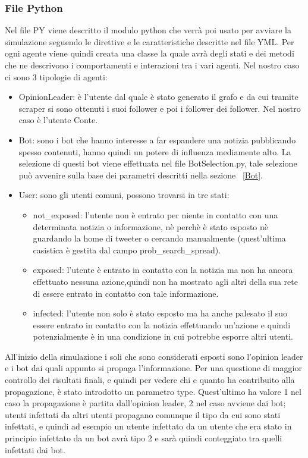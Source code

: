         \subsubsection{File Python}
        Nel file PY viene descritto il modulo python che verrà poi usato per avviare la simulazione seguendo le direttive e le caratteristiche descritte nel file YML. Per ogni agente viene quindi creata una classe la quale avrà degli stati e dei metodi che ne descrivono i comportamenti e interazioni tra i vari agenti. Nel nostro caso ci sono 3 tipologie di agenti:
        \begin{itemize}
        \item OpinionLeader: è l’utente dal quale è stato generato il grafo e da cui tramite scraper si sono ottenuti i suoi follower e poi i follower dei follower. Nel nostro caso è l’utente Conte.
        \item Bot: sono i bot che hanno interesse a far espandere una notizia pubblicando spesso contenuti, hanno quindi un potere di influenza mediamente alto. La selezione di questi bot viene effettuata nel file BotSelection.py, tale selezione può avvenire sulla base dei parametri descritti nella sezione ~\ref{Bot}.
        \item User: sono gli utenti comuni, possono trovarsi in tre stati:
          \begin{itemize}
          \item not_exposed: l’utente non è entrato per niente in contatto con una determinata notizia o informazione, nè perchè è stato esposto nè guardando la home di tweeter o cercando manualmente (quest’ultima casistica è gestita dal campo prob_search_spread).
          \item exposed: l’utente è entrato in contatto con la notizia ma non ha ancora effettuato nessuna azione,quindi non ha mostrato agli altri della sua rete di essere entrato in contatto con tale informazione.
          \item infected: l’utente non solo è stato esposto ma ha anche palesato il suo essere entrato in contatto con la notizia effettuando un'azione e quindi potenzialmente è in una condizione in cui potrebbe esporre altri utenti.
          \end{itemize}
        \end{itemize}
        All’inizio della simulazione i soli che sono considerati esposti sono l’opinion leader e i bot dai quali appunto si propaga l’informazione. Per una questione di maggior controllo dei risultati finali, e quindi per vedere chi e quanto ha contribuito alla propagazione, è stato introdotto un parametro type. Quest’ultimo ha valore 1 nel caso la propagazione è partita dall’opinion leader, 2 nel caso avviene dai bot; utenti infettati da altri utenti propagano comunque il tipo da cui sono stati infettati, e quindi ad esempio un utente infettato da un utente che era stato in principio infettato da un bot avrà tipo 2 e sarà quindi conteggiato tra quelli infettati dai bot.
